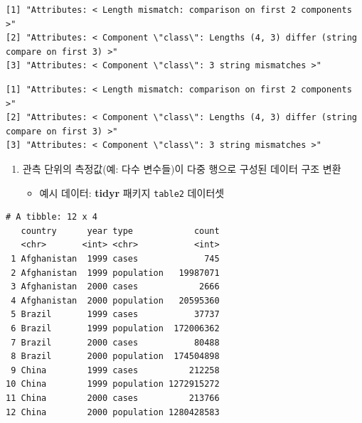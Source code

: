 \documentclass[
  11pt,
]{krantz}
\newenvironment{Shaded}{\begin{snugshade}}{\end{snugshade}}
\newcommand{\CommentTok}[1]{\textcolor[rgb]{0.37,0.37,0.37}{\textit{#1}}}
\newcommand{\DecValTok}[1]{\textcolor[rgb]{0.06,0.06,0.06}{#1}}
\newcommand{\KeywordTok}[1]{\textcolor[rgb]{0.27,0.27,0.27}{\textbf{#1}}}
\newcommand{\NormalTok}[1]{#1}
\newcommand{\OperatorTok}[1]{\textcolor[rgb]{0.43,0.43,0.43}{\textbf{#1}}}
\newcommand{\StringTok}[1]{\textcolor[rgb]{0.5,0.5,0.5}{#1}}
\providecommand{\tightlist}{%
  \setlength{\itemsep}{0pt}\setlength{\parskip}{0pt}}
\begin{document}
\begin{verbatim}
[1] "Attributes: < Length mismatch: comparison on first 2 components >"                     
[2] "Attributes: < Component \"class\": Lengths (4, 3) differ (string compare on first 3) >"
[3] "Attributes: < Component \"class\": 3 string mismatches >"                              
\end{verbatim}

\begin{Shaded}
\end{Shaded}

\begin{verbatim}
[1] "Attributes: < Length mismatch: comparison on first 2 components >"                     
[2] "Attributes: < Component \"class\": Lengths (4, 3) differ (string compare on first 3) >"
[3] "Attributes: < Component \"class\": 3 string mismatches >"                              
\end{verbatim}

\normalsize

\begin{enumerate}
\def\labelenumi{\arabic{enumi}.}
\setcounter{enumi}{1}
\tightlist
\item
  관측 단위의 측정값(예: 다수 변수들)이 다중 행으로 구성된 데이터 구조 변환

  \begin{itemize}
  \tightlist
  \item
    예시 데이터: \textbf{tidyr} 패키지 \texttt{table2} 데이터셋
  \end{itemize}
\end{enumerate}

\footnotesize

\begin{Shaded}
\end{Shaded}

\begin{verbatim}
# A tibble: 12 x 4
   country      year type            count
   <chr>       <int> <chr>           <int>
 1 Afghanistan  1999 cases             745
 2 Afghanistan  1999 population   19987071
 3 Afghanistan  2000 cases            2666
 4 Afghanistan  2000 population   20595360
 5 Brazil       1999 cases           37737
 6 Brazil       1999 population  172006362
 7 Brazil       2000 cases           80488
 8 Brazil       2000 population  174504898
 9 China        1999 cases          212258
10 China        1999 population 1272915272
11 China        2000 cases          213766
12 China        2000 population 1280428583
\end{verbatim}
\end{document}
